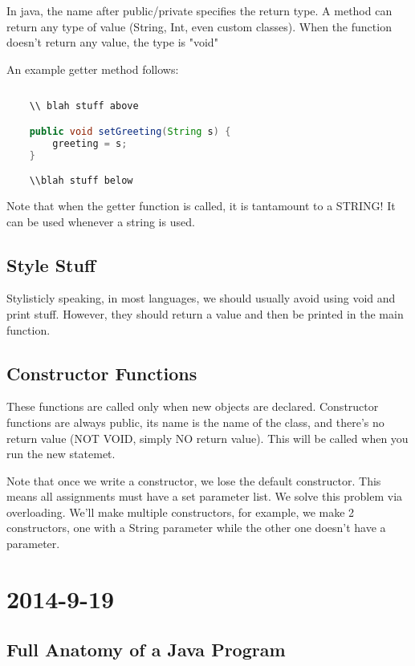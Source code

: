 \documentclass [12 pt, twoside] {article}
\begin{document}
In java, the name after public/private specifies the return type.
A method can return any type of value (String, Int, even custom classes).
When the function doesn't return any value, the type is "void"


An example getter method follows:
\begin{lstlisting}[language=java]
	
	\\ blah stuff above

	public void setGreeting(String s) {
		greeting = s;
	}

	\\blah stuff below
\end{lstlisting}


Note that when the getter function is called, it is tantamount to a STRING!
It can be used whenever a string is used.


\subsection{Style Stuff}


Stylisticly speaking, in most languages, we should usually avoid using void and print stuff.
However, they should return a value and then be printed in the main function.


\subsection{Constructor Functions}


These functions are called only when new objects are declared.
Constructor functions are always public, its name is the name of the class, and there's no return value (NOT VOID, simply NO return value).
This will be called when you run the new statemet.


Note that once we write a constructor, we lose the default constructor.
This means all assignments must have a set parameter list.
We solve this problem via overloading.
We'll make multiple constructors, for example, we make 2 constructors, one with a String parameter while the other one doesn't have a parameter.


\section{2014-9-19}
\subsection{Full Anatomy of a Java Program}
\end{document}
